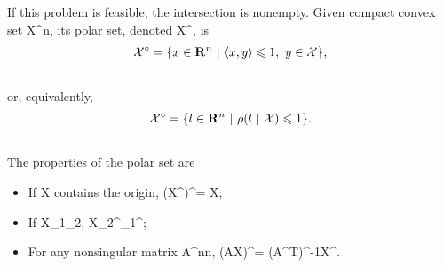 \documentclass[letterpaper,10pt,english]{sphinxmanual}
\begin{document}
If this problem is feasible, the intersection is nonempty. Given
compact convex set {\mathcal X}^n, its polar
set, denoted {\mathcal X}^\circ, is
\begin{gather}
\begin{split}{\mathcal X}^\circ = \{x\in{\bf R}^n ~|~ \langle x,y\rangle\leqslant1, ~ y\in{\mathcal X}\},\end{split}\notag\\\begin{split}\end{split}\notag
\end{gather}
or, equivalently,
\begin{gather}
\begin{split}{\mathcal X}^\circ = \{l\in{\bf R}^n ~|~ \rho(l ~|~ {\mathcal X})\leqslant1\}.\end{split}\notag\\\begin{split}\end{split}\notag
\end{gather}
The properties of the polar set are
\begin{itemize}
\item {} 
If {\mathcal X} contains the origin,
({\mathcal X}^\circ)^\circ = {\mathcal X};

\item {} 
If {\mathcal X}_1_2,
{\mathcal X}_2^\circ{}_1^\circ;

\item {} 
For any nonsingular matrix A^{n\times n},
(A{\mathcal X})^\circ = (A^T)^{-1}{\mathcal X}^\circ.

\end{itemize}
\end{document}
